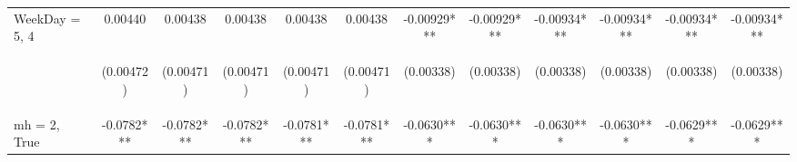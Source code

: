 \documentclass[]{article}
\begin{document}
\begin{center}
\begin{tabular}{lccccccccccc}
WeekDay = 5, 4 & 0.00440 & 0.00438 & 0.00438 & 0.00438 & 0.00438 & -0.00929*** & -0.00929*** & -0.00934*** & -0.00934*** & -0.00934*** & -0.00934*** \\
\vspace{4pt} & \begin{footnotesize}(0.00472)\end{footnotesize} & \begin{footnotesize}(0.00471)\end{footnotesize} & \begin{footnotesize}(0.00471)\end{footnotesize} & \begin{footnotesize}(0.00471)\end{footnotesize} & \begin{footnotesize}(0.00471)\end{footnotesize} & \begin{footnotesize}(0.00338)\end{footnotesize} & \begin{footnotesize}(0.00338)\end{footnotesize} & \begin{footnotesize}(0.00338)\end{footnotesize} & \begin{footnotesize}(0.00338)\end{footnotesize} & \begin{footnotesize}(0.00338)\end{footnotesize} & \begin{footnotesize}(0.00338)\end{footnotesize} \\
mh = 2, True & -0.0782*** & -0.0782*** & -0.0782*** & -0.0781*** & -0.0781*** & -0.0630*** & -0.0630*** & -0.0630*** & -0.0630*** & -0.0629*** & -0.0629*** \\

\end{tabular}
\end{center}
\end{document}
